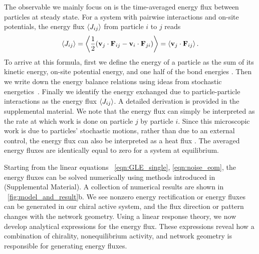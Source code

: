 \documentclass[
 preprint,
 preprintnumbers,
 amsmath,amssymb,
 aps,
 pre,
 longbibliography,
 superscriptaddress,
 10pt, twocolumn
]{revtex4-1}
\begin{document}
The observable we mainly focus on is the time-averaged energy flux between particles at steady state. For a system with pairwise interactions and on-site potentials, the energy flux $\expval{J_{ij}}$ from particle $i$ to $j$ reads
\begin{equation} \label{eqn:flux_def}
    \expval{J_{ij}} = \expval{\frac{1}{2} (\mathbf{v}_j \cdot \mathbf{F}_{ij} - \mathbf{v}_i \cdot \mathbf{F}_{ji})}
    = \expval{\mathbf{v}_j \cdot \mathbf{F}_{ij}}.
\end{equation}
To arrive at this formula, first we define the energy of a particle as the sum of its kinetic energy, on-site potential energy, and one half of the bond energies \cite{Lepri2003ThermalConduction}. Then we write down the energy balance relations using ideas from stochastic energetics~\cite{Sekimoto1998LangevinEquation}. Finally we identify the energy exchanged due to particle-particle interactions as the energy flux $\expval{J_{ij}}$. A detailed derivation is provided in the supplemental material.
We note that the energy flux can simply be interpreted as the rate at which work is done on particle $j$ by particle $i$.
Since this microscopic work is due to particles' stochastic motions, rather than due to an external control, the energy flux can also be interpreted as a heat flux \cite{Sekimoto1998LangevinEquation,Lepri2003ThermalConduction}. The averaged energy fluxes are identically equal to zero for a system at equilibrium.

Starting from the linear equations \eqnname~\eqref{eqn:GLE_single}, \eqref{eqn:noise_eom}, the energy fluxes can be solved numerically using methods introduced in \cite{Gardiner2009ItoCalculus,Ceriotti2010ColoredNoiseThermostats} (Supplemental Material).
A collection of numerical results are shown in \figurename~\ref{fig:model_and_result}b. We see nonzero energy rectification or energy fluxes can be generated in our chiral active system, and the flux direction or pattern changes with the network geometry.
Using a linear response theory, we now develop analytical expressions for the energy flux. These expressions reveal how a combination of chirality, nonequilibrium activity, and network geometry is responsible for generating energy fluxes.
\end{document}

